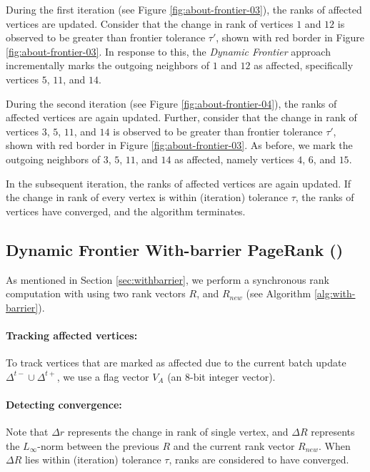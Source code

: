 During the first iteration (see Figure \ref{fig:about-frontier-03}), the ranks of affected vertices are updated. Consider that the change in rank of vertices $1$ and $12$ is observed to be greater than frontier tolerance $\tau'$, shown with red border in Figure \ref{fig:about-frontier-03}. In response to this, the \textit{Dynamic Frontier} approach incrementally marks the outgoing neighbors of $1$ and $12$ as affected, specifically vertices $5$, $11$, and $14$.

During the second iteration (see Figure \ref{fig:about-frontier-04}), the ranks of affected vertices are again updated. Further, consider that the change in rank of vertices $3$, $5$, $11$, and $14$ is observed to be greater than frontier tolerance $\tau'$, shown with red border in Figure \ref{fig:about-frontier-03}. As before, we mark the outgoing neighbors of $3$, $5$, $11$, and $14$ as affected, namely vertices $4$, $6$, and $15$.

In the subsequent iteration, the ranks of affected vertices are again updated. If the change in rank of every vertex is within (iteration) tolerance $\tau$, the ranks of vertices have converged, and the algorithm terminates.




\subsection{Dynamic Frontier With-barrier PageRank (\FroWbar{})}
\label{sec:frontier-withbarrier}

As mentioned in Section \ref{sec:withbarrier}, we perform a synchronous rank computation with \FroWbar{} using two rank vectors $R$, and $R_{new}$ (see Algorithm \ref{alg:with-barrier}).

\paragraph{Tracking affected vertices:}

To track vertices that are marked as affected due to the current batch update $\Delta^{t-} \cup \Delta^{t+}$, we use a flag vector $V_A$ (an 8-bit integer vector).

\paragraph{Detecting convergence:}

Note that $\Delta r$ represents the change in rank of single vertex, and $\Delta R$ represents the $L_\infty$-norm between the previous $R$ and the current rank vector $R_{new}$. When $\Delta R$ lies within (iteration) tolerance $\tau$, ranks are considered to have converged.




